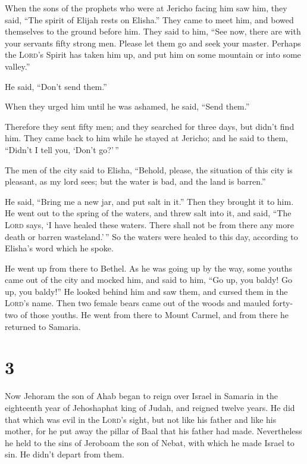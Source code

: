  When the sons of the prophets who were at Jericho facing
him saw him, they said, ``The spirit of Elijah rests on Elisha.'' They
came to meet him, and bowed themselves to the ground before him.
 They said to him, ``See now, there are with your
servants fifty strong men. Please let them go and seek your master.
Perhaps the \textsc{Lord}'s Spirit has taken him up, and put him on some
mountain or into some valley.''

He said, ``Don't send them.''

 When they urged him until he was ashamed, he said,
``Send them.''

Therefore they sent fifty men; and they searched for three days, but
didn't find him.  They came back to him while he stayed
at Jericho; and he said to them, ``Didn't I tell you, `Don't go?'\,''

 The men of the city said to Elisha, ``Behold, please,
the situation of this city is pleasant, as my lord sees; but the water
is bad, and the land is barren.''

 He said, ``Bring me a new jar, and put salt in it.''
Then they brought it to him.  He went out to the spring
of the waters, and threw salt into it, and said, ``The \textsc{Lord}
says, `I have healed these waters. There shall not be from there any
more death or barren wasteland.'\,''  So the waters were
healed to this day, according to Elisha's word which he spoke.

 He went up from there to Bethel. As he was going up by
the way, some youths came out of the city and mocked him, and said to
him, ``Go up, you baldy! Go up, you baldy!''  He looked
behind him and saw them, and cursed them in the \textsc{Lord}'s name.
Then two female bears came out of the woods and mauled forty-two of
those youths.  He went from there to Mount Carmel, and
from there he returned to Samaria.

\hypertarget{section-2}{%
\section{3}\label{section-2}}

 Now Jehoram the son of Ahab began to reign over Israel in
Samaria in the eighteenth year of Jehoshaphat king of Judah, and reigned
twelve years.  He did that which was evil in the
\textsc{Lord}'s sight, but not like his father and like his mother, for
he put away the pillar of Baal that his father had made. 
Nevertheless he held to the sins of Jeroboam the son of Nebat, with
which he made Israel to sin. He didn't depart from them.

